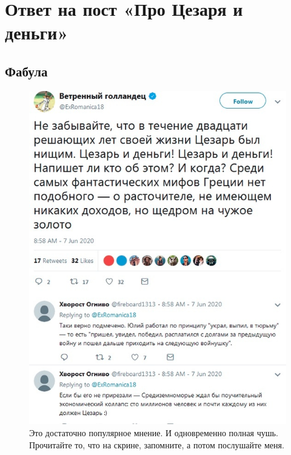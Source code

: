 \chapter{Ответ на пост «Про Цезаря и деньги» }




\section{Фабула}
\begin{figure}[h!tb]
	\centering\includegraphics[scale=0.4]{Data/Caesar_and_money/1623334104151412415.png}
	\caption{Это достаточно популярное мнение. И одновременно полная чушь. Прочитайте то, что на скрине, запомните, а потом послушайте меня.
	}
	\label{fig:fabula} %
\end{figure}



